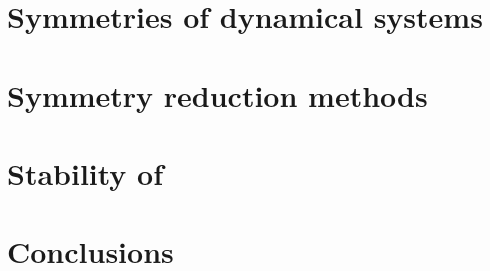 \documentclass[aps,prl,preprint,superscriptaddress]{revtex4}
\begin{document}
\section{\label{s:symDyn} Symmetries of dynamical systems}
    

\section{\label{s:symRedGeneral} Symmetry reduction methods}
    
    
    
    
    


\section{Stability of \reqva}
    

\section{Conclusions}
    





    
\end{document}

